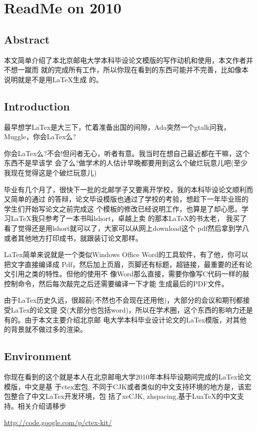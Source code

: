 \documentclass[a4paper,oneside,xetex]{ctexbook}
\begin{document}
\chapter{ReadMe on 2010}
\section{Abstract}
本文简单介绍了本北京邮电大学本科毕设论文模版的写作动机和使用，本文作者并不想一蹴而
就的完成所有工作，所以你现在看到的东西可能并不完善，比如像本说明就是不是用LaTeX生成
的。
\section{Introduction}
最早想学LaTex是大三下，忙着准备出国的间隙，Ada突然一个gtalk问我，Muggle，你会LaTex么?

你会LaTex么?不会!但问者无心，听者有意。我当时在想自己最近都在干嘛，这个东西不是早该学
会了么?做学术的人估计早晚都要用到这么个破烂玩意儿吧(至少我现在觉得这是个破烂玩意儿)

毕业有几个月了，很快下一批的北邮学子又要离开学校，我的本科毕设论文顺利而又简单的通过
的答辩，论文毕设模版也通过了学校的考验，想趁下一年毕业班的学生们开始写论文之前完成这
个模板的修改已经说明工作，也算是了却心愿。学习LaTeX我只参考了一本书叫lshort，卓越上卖
的那本LaTeX的书太老， 我买了看了觉得还是用lshort就可以了，大家可以从网上download这个
pdf然后拿到学八或者其他地方打印成书，就跟装订论文那样。

LaTex简单来说就是一个类似Windows Office Word的工具软件，有了他，你可以把文字直接编译成
Pdf，然后加上页眉，页脚还有标题，超链接，最重要的还有论文引用之类的特性。但他的使用不
像Word那么直接，需要你像写C代码一样的敲控制命令，然后每次敲完之后还需要编译一下才能
生成最后的PDF文件。

由于LaTex历史久远，很超前(不然也不会现在还用他)，大部分的会议和期刊都接受LaTex的论文提
交(大部分也包括word)，所以在学术圈，这个东西的影响力还是有的。由于本文主要介绍北京邮
电大学本科毕业设计论文的LaTex模版，对其他的背景就不做过多的渲染。
\section{Environment}
你现在看到的这个就是本人在北京邮电大学2010年本科毕设期间完成的LaTex论文模版，中文是基
于ctex宏包, 不同于CJK或者类似的中文支持环境的地方是，该宏包整合了中文LaTex开发环境，包
括了xeCJK, zhspacing,基于LuaTeX的中文支持。相关介绍请移步

\href{http://code.google.com/p/ctex-kit/}{http://code.google.com/p/ctex-kit/}
\end{document}
